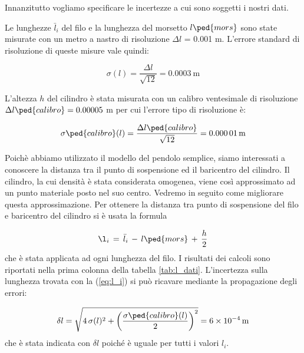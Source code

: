 \label{l_medie}

Innanzitutto vogliamo specificare le incertezze a cui sono soggetti i nostri dati.

Le lunghezze $\bar{l}_i$ del filo e la lunghezza del morsetto $l\ped{mors}$ sono state misurate con un metro a nastro di risoluzione
$\Delta l$ = 0.001 m. L'errore standard di risoluzione di queste misure vale quindi:

\begin{equation}
    \sigma(l) = \frac{\Delta l}{\sqrt{12}} = \SI{0.0003}{\metre}
\end{equation}

L'altezza $h$ del cilindro è stata misurata con un calibro ventesimale di risoluzione $\Delta l\ped{calibro} = 0.00005$ m
per cui l'errore tipo di risoluzione è:

\begin{equation}
    \sigma\ped{calibro}(l) = \frac{\Delta l\ped{calibro}}{\sqrt{12}} = \SI{0.00001}{\metre}
\end{equation}

Poichè abbiamo utilizzato il modello del pendolo semplice, siamo interessati a conoscere la distanza tra il punto
di sospensione ed il baricentro del cilindro. Il cilindro, la cui densità è stata considerata omogenea,
viene così approssimato ad un punto materiale posto nel suo centro. Vedremo in seguito come migliorare questa approssimazione.
Per ottenere la distanza tra punto di sospensione del filo e baricentro del cilindro si è usata la formula

\begin{equation}
	\l_i \,=\, \bar{l}_i \,-\, l\ped{mors} \,+\, \frac{h}{2}
    \label{eq:l_i}
\end{equation}
%
che è stata applicata ad ogni lunghezza del filo. I risultati dei calcoli sono riportati nella prima colonna
della tabella \ref{tab:l_dati}. L'incertezza sulla lunghezza trovata con la (\ref{eq:l_i}) si può ricavare mediante la propagazione
degli errori:

\begin{equation}
	\delta l = \sqrt{4\,\sigma(l)^2 + \left(\frac{\sigma\ped{calibro}(l)}{2}\right) ^2} = \SI{6e-4}{m}
\end{equation}
%
che è stata indicata con $\delta l$ poiché è uguale per tutti i valori $l_i$.

